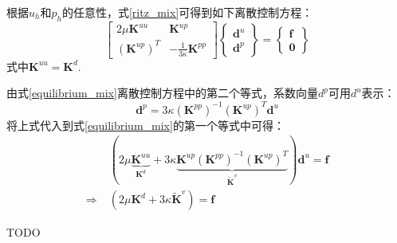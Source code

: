 根据$u_h$和$p_h$的任意性，式\eqref{ritz_mix}可得到如下离散控制方程：
\begin{equation}\label{equilibrium_mix}
    \begin{bmatrix}
        2\mu\boldsymbol K^{uu} & \boldsymbol K^{up} \\ (\boldsymbol K^{up})^T & -\frac{1}{3\kappa}\boldsymbol K^{pp}
    \end{bmatrix}
    \begin{Bmatrix}
        \boldsymbol d^u \\ \boldsymbol d^p 
    \end{Bmatrix} =
    \begin{Bmatrix}
        \boldsymbol f \\ \boldsymbol 0 
    \end{Bmatrix}
\end{equation}
式中$\boldsymbol K^{uu} = \boldsymbol K^d$. 

由式\eqref{equilibrium_mix}离散控制方程中的第二个等式，系数向量$d^p$可用$d^u$表示：
\begin{equation}
    \boldsymbol d^p = 3\kappa(\boldsymbol K^{pp})^{-1} (\boldsymbol K^{up})^T \boldsymbol d^u
\end{equation}
将上式代入到式\eqref{equilibrium_mix}的第一个等式中可得：
\begin{equation}\label{equilibrium_projection}
    \begin{split}
        &(2\mu\underbrace{\boldsymbol K^{uu}}_{\boldsymbol K^d} + 3\kappa \underbrace{\boldsymbol K^{up}(\boldsymbol K^{pp})^{-1}(\boldsymbol K^{up})^{T}}_{\tilde{\boldsymbol K}^v}) \boldsymbol d^u = \boldsymbol f \\
        \Rightarrow\;& (2\mu \boldsymbol K^d + 3\kappa \tilde{\boldsymbol K}^v) = \boldsymbol f
    \end{split}
\end{equation}

TODO 


